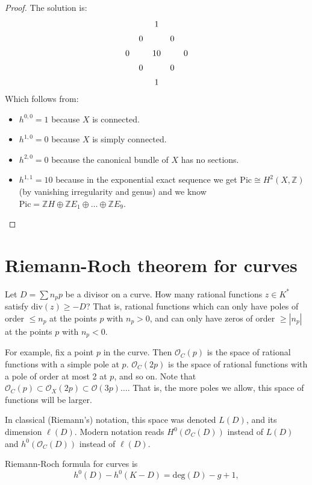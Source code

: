 \begin{proof}
The solution is:
$$
\begin{aligned}\xymatrix@C=.5em@R=.5em{
&  &   1\\
&  0&  &  0\\
0&&  10&  &  0\\
&  0&  &  0\\
&  &  1
}\end{aligned}
$$
Which follows from:
\begin{itemize}
\item $h^{0,0}=1$ because $X$ is connected.
\item $h^{1,0}=0$ because $X$ is simply connected.
\item $h^{2,0}=0$ because the canonical bundle of $X$ has no sections.
\item $h^{1,1}=10$ because in the exponential exact sequence
we get $\text{Pic} \cong H^2(X,\mathbb{Z})$
(by vanishing irregularity and genus)
and we know 
$\text{Pic}=\mathbb{Z}H \oplus \mathbb{Z}E_1\oplus…\oplus \mathbb{Z}E_9$.
\end{itemize}
\end{proof}

\section{Riemann-Roch theorem for curves}
\label{section-riemann-roch}

\noindent
Let $D=\sum n_p p$ be a divisor on a curve.
How many rational functions $z \in K^*$ satisfy
$\text{div}(z) \geq -D$? That is, rational functions
which can only have poles of order $\leq n_p$
at the points $p$ with $n_p>0$,
and can only have zeros of order $\geq  |n_p|$
at the points $p$ with $n_p<0$.

For example, fix a point $p$ in the curve.
Then $\mathcal{O}_C(p)$ is the space
of rational functions with a simple pole at $p$.
$\mathcal{O}_C(2p)$ is the space of rational functions
with a pole of order at most 2 at $p$, and so on.
Note that $\mathcal{O}_C(p) \subset \mathcal{O}_X (2p) 
\subset \mathcal{O}(3p)…$.
That is, the more poles we allow, this space of functions will be larger.

In classical (Riemann's) notation, this space was denoted
$L(D)$, and its dimension $\ell(D)$.
Modern notation reads $H^0(\mathcal{O}_C(D))$
instead of $L(D)$ and
$h^0(\mathcal{O}_C(D))$
instead of $\ell(D)$.

Riemann-Roch formula for curves is
\begin{equation}
\label{equation-riemann-roch-curves}
h^0(D)-h^0(K-D)=\text{deg}(D)-g+1,
\end{equation}


